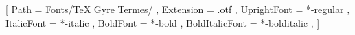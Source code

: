 %
%
% 
%




\usepackage{iftex}
    \ifPDFTeX    %
        \usepackage[utf8]{inputenc}
        \usepackage[T1]{fontenc}
        \usepackage{mathptmx}    %
        \usepackage[letterspace=70]{microtype}
        \usepackage{anyfontsize}
            \newcommand*{\myfont}{\fontfamily{phv}\selectfont}
    \else    %
        \usepackage{fontspec}
            \setmainfont{Times New Roman}
            \newfontfamily\myfont[Ligatures=TeX]{Arial}
    
            \newfontfamily{}[
                Path = Fonts/TeX Gyre Termes/ ,
                Extension      = .otf ,
                UprightFont    = *-regular ,
                ItalicFont     = *-italic ,
                BoldFont       = *-bold ,
                BoldItalicFont = *-bolditalic ,
                ]
        \makeatletter
            \begingroup
                \tgtermes
            \endgroup
        \makeatother
    \fi

